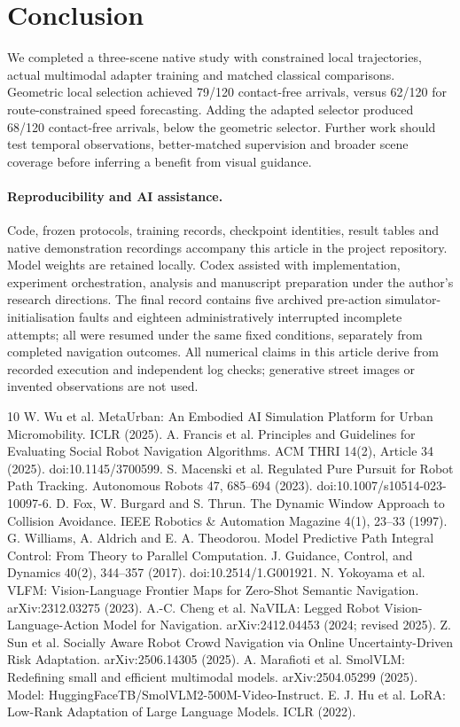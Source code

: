 \documentclass[10pt,a4paper]{article}
\begin{document}
\section{Conclusion}
We completed a three-scene native study with constrained local trajectories, actual multimodal adapter training and matched classical comparisons. Geometric local selection achieved 79/120 contact-free arrivals, versus 62/120 for route-constrained speed forecasting. Adding the adapted selector produced 68/120 contact-free arrivals, below the geometric selector. Further work should test temporal observations, better-matched supervision and broader scene coverage before inferring a benefit from visual guidance.

\paragraph{Reproducibility and AI assistance.}
Code, frozen protocols, training records, checkpoint identities, result tables and native demonstration recordings accompany this article in the project repository. Model weights are retained locally. Codex assisted with implementation, experiment orchestration, analysis and manuscript preparation under the author's research directions. The final record contains five archived pre-action simulator-initialisation faults and eighteen administratively interrupted incomplete attempts; all were resumed under the same fixed conditions, separately from completed navigation outcomes. All numerical claims in this article derive from recorded execution and independent log checks; generative street images or invented observations are not used.

\begin{thebibliography}{10}\footnotesize\setlength{\itemsep}{1pt}
 W. Wu et al. MetaUrban: An Embodied AI Simulation Platform for Urban Micromobility. ICLR (2025).
 A. Francis et al. Principles and Guidelines for Evaluating Social Robot Navigation Algorithms. ACM THRI 14(2), Article 34 (2025). doi:10.1145/3700599.
 S. Macenski et al. Regulated Pure Pursuit for Robot Path Tracking. Autonomous Robots 47, 685--694 (2023). doi:10.1007/s10514-023-10097-6.
 D. Fox, W. Burgard and S. Thrun. The Dynamic Window Approach to Collision Avoidance. IEEE Robotics \& Automation Magazine 4(1), 23--33 (1997).
 G. Williams, A. Aldrich and E. A. Theodorou. Model Predictive Path Integral Control: From Theory to Parallel Computation. J. Guidance, Control, and Dynamics 40(2), 344--357 (2017). doi:10.2514/1.G001921.
 N. Yokoyama et al. VLFM: Vision-Language Frontier Maps for Zero-Shot Semantic Navigation. arXiv:2312.03275 (2023).
 A.-C. Cheng et al. NaVILA: Legged Robot Vision-Language-Action Model for Navigation. arXiv:2412.04453 (2024; revised 2025).
 Z. Sun et al. Socially Aware Robot Crowd Navigation via Online Uncertainty-Driven Risk Adaptation. arXiv:2506.14305 (2025).
 A. Marafioti et al. SmolVLM: Redefining small and efficient multimodal models. arXiv:2504.05299 (2025). Model: HuggingFaceTB/SmolVLM2-500M-Video-Instruct.
 E. J. Hu et al. LoRA: Low-Rank Adaptation of Large Language Models. ICLR (2022).
\end{thebibliography}
\end{document}
